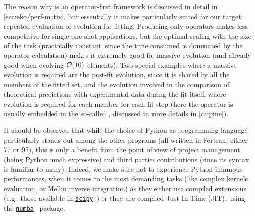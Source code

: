 The reason why \eko{} is an operator-first framework is discussed in detail in
\cref{sec:eko/perf-motiv}, but essentially it makes \eko{} particularly suited
for our target: repeated evaluation of evolution for \pdf{} fitting.
Producing only operators makes \eko{} less competitive for single one-shot
applications, but the optimal scaling with the size of the task (practically
constant, since the time consumed is dominated by the operator calculation)
makes it extremely good for massive evolution (and already good when evolving
$\order{10}$ elements).
%
Two special examples where a massive evolution is required are the post-fit
evolution, since it is shared by all the members of the fitted \pdf set, and
the evolution involved in the comparison of theoretical predictions with
experimental data during the fit itself, where evolution is required for each
\pdf member for each fit step (here the operator is usually embedded in the
so-called \fktab, discussed in more details in \cref{ch:pine}).


It should be observed that while the choice of Python as programming language
particularly stands out among the other programs (all written in Fortran,
either 77 or 95), this is only a benefit from the point of view of project
management (being Python much expressive) and third parties contributions
(since its syntax is familiar to many).
Indeed, we make sure not to experience Python infamous performances, when it
comes to the most demanding tasks (like complex kernels evaluation, or Mellin
inverse integration) as they either use compiled extensions (e.g.\ those
available in \href{https://scipy.org/}{\texttt{scipy}}~\cite{2020SciPy-NMeth})
or they are compiled Just In Time (JIT), using the
\href{https://numba.pydata.org/}{\texttt{numba}}~\cite{numba} package.


